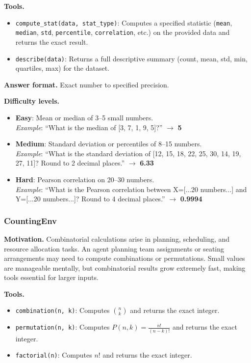 \textbf{Tools.}
\begin{itemize}
    \item \texttt{compute\_stat(data, stat\_type)}: Computes a specified statistic (\texttt{mean}, \texttt{median}, \texttt{std}, \texttt{percentile}, \texttt{correlation}, etc.) on the provided data and returns the exact result.
    \item \texttt{describe(data)}: Returns a full descriptive summary (count, mean, std, min, quartiles, max) for the dataset.
\end{itemize}

\textbf{Answer format.} Exact number to specified precision.

\textbf{Difficulty levels.}
\begin{itemize}
    \item \textbf{Easy}: Mean or median of 3--5 small numbers.\\
    \emph{Example}: ``What is the median of [3, 7, 1, 9, 5]?'' $\to$ \textbf{5}
    \item \textbf{Medium}: Standard deviation or percentiles of 8--15 numbers.\\
    \emph{Example}: ``What is the standard deviation of [12, 15, 18, 22, 25, 30, 14, 19, 27, 11]? Round to 2 decimal places.'' $\to$ \textbf{6.33}
    \item \textbf{Hard}: Pearson correlation on 20--30 numbers.\\
    \emph{Example}: ``What is the Pearson correlation between X=[...20 numbers...] and Y=[...20 numbers...]? Round to 4 decimal places.'' $\to$ \textbf{0.9994}
\end{itemize}

\subsubsection{CountingEnv}

\textbf{Motivation.}
Combinatorial calculations arise in planning, scheduling, and resource allocation tasks. An agent planning team assignments or seating arrangements may need to compute combinations or permutations. Small values are manageable mentally, but combinatorial results grow extremely fast, making tools essential for larger inputs.

\textbf{Tools.}
\begin{itemize}
    \item \texttt{combination(n, k)}: Computes $\binom{n}{k}$ and returns the exact integer.
    \item \texttt{permutation(n, k)}: Computes $P(n,k) = \frac{n!}{(n-k)!}$ and returns the exact integer.
    \item \texttt{factorial(n)}: Computes $n!$ and returns the exact integer.
\end{itemize}

